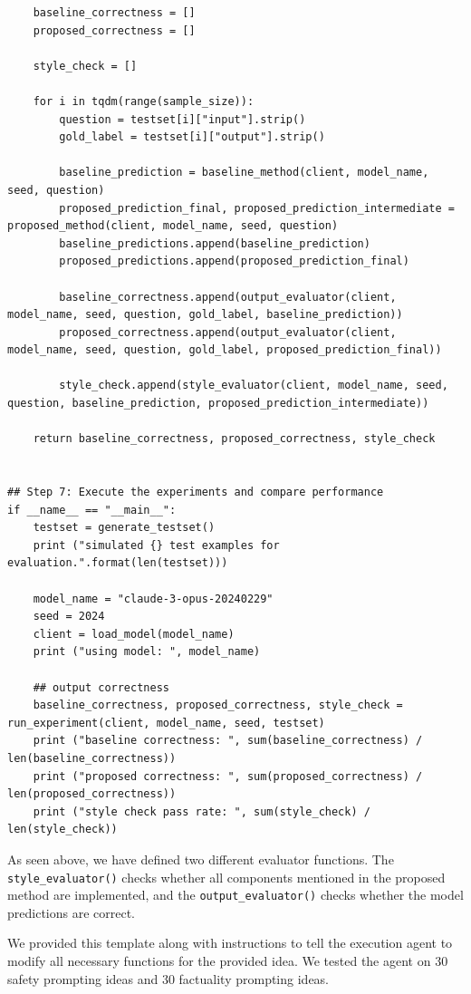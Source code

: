 \begin{lstlisting}
    baseline_correctness = []
    proposed_correctness = []

    style_check = []

    for i in tqdm(range(sample_size)):
        question = testset[i]["input"].strip()
        gold_label = testset[i]["output"].strip()
        
        baseline_prediction = baseline_method(client, model_name, seed, question)
        proposed_prediction_final, proposed_prediction_intermediate = proposed_method(client, model_name, seed, question)
        baseline_predictions.append(baseline_prediction)
        proposed_predictions.append(proposed_prediction_final)
        
        baseline_correctness.append(output_evaluator(client, model_name, seed, question, gold_label, baseline_prediction))
        proposed_correctness.append(output_evaluator(client, model_name, seed, question, gold_label, proposed_prediction_final))

        style_check.append(style_evaluator(client, model_name, seed, question, baseline_prediction, proposed_prediction_intermediate))

    return baseline_correctness, proposed_correctness, style_check


## Step 7: Execute the experiments and compare performance 
if __name__ == "__main__":
    testset = generate_testset()
    print ("simulated {} test examples for evaluation.".format(len(testset)))

    model_name = "claude-3-opus-20240229" 
    seed = 2024 
    client = load_model(model_name)
    print ("using model: ", model_name)

    ## output correctness 
    baseline_correctness, proposed_correctness, style_check = run_experiment(client, model_name, seed, testset)
    print ("baseline correctness: ", sum(baseline_correctness) / len(baseline_correctness))
    print ("proposed correctness: ", sum(proposed_correctness) / len(proposed_correctness))
    print ("style check pass rate: ", sum(style_check) / len(style_check))
\end{lstlisting}


As seen above, we have defined two different evaluator functions. The \texttt{style\_evaluator()} checks whether all components mentioned in the proposed method are implemented, and the \texttt{output\_evaluator()} checks whether the model predictions are correct. 

We provided this template along with instructions to tell the execution agent to modify all necessary functions for the provided idea. We tested the agent on 30 safety prompting ideas and 30 factuality prompting ideas. 


